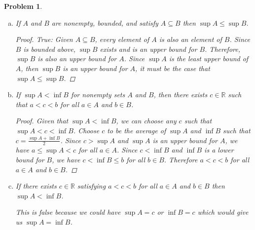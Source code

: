 \documentclass[12pt]{article}
\newtheorem{problem}{Problem}
\newcommand{\RR}{\ensuremath{\mathbb R}}
\begin{document}
\begin{problem} %


\begin{enumerate}[(a)]
\item If $A$ and $B$ are nonempty, bounded, and satisfy $A\subseteq B$
then $\sup A\le \sup B$.

 \begin{proof} True: Given $A \subseteq B$, every element of $A$ is also an element of $B$. Since $B$ is bounded above, $\sup B$ exists and is an upper bound for $B$. Therefore, $\sup B$ is also an upper bound for $A$. \newline
Since $\sup A$ is the least upper bound of $A$, then $\sup B$ is an upper bound for $A$, it must be the case that $\sup A \leq \sup B$.\end{proof}

\item If $\sup A< \inf B$ for nonempty sets $A$ and $B$, then there exists
$c\in\RR$ such that $a<c<b$ for all $a\in A$ and $b\in B$.

\begin{proof} Given that $\sup A < \inf B$, we can choose any $c$ such that $\sup A < c < \inf B$. Choose $c$ to be the average of $\sup A$ and $\inf B$ such that $c = \frac{\sup A + \inf B}{2}$.
\newline \newline
Since $c > \sup A$ and $\sup A$ is an upper bound for $A$, we have $a \leq \sup A < c$ for all $a \in A$. \newline 
Since $c < \inf B$ and $\inf B$ is a lower bound for $B$, we have $c < \inf B \leq b$ for all $b \in B$. \newline \newline 
Therefore $a < c < b$ for all $a \in A$ and $b \in B$.
\end{proof}

\item If there exists $c\in\RR$ satisfying $a<c<b$ for all
$a\in A$ and $b\in B$ then $\sup A< \inf B$. 

 \bigskip This is false because we could have $\sup A = c$ or $\inf B = c$ which would give us $\sup A = \inf B$.

\end{enumerate}
\end{problem}
\end{document}
